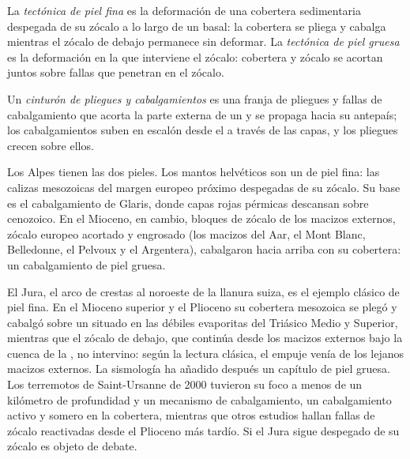 \begin{definition}\label{def:b2:alpine-orogen:skin}
La \emph{tectónica de piel fina} es la deformación de una
cobertera sedimentaria despegada de su zócalo a lo largo de un  basal: la cobertera se pliega y
cabalga mientras el zócalo de debajo permanece sin deformar. La \emph{tectónica de piel
gruesa} es la deformación en la que interviene el zócalo:
cobertera y zócalo se acortan juntos sobre fallas que penetran en el zócalo.
\end{definition}

\begin{definition}\label{def:b2:alpine-orogen:ftb}
Un \emph{cinturón de pliegues y cabalgamientos} es una franja de pliegues y fallas de cabalgamiento
que acorta la parte externa de un  y se propaga hacia su antepaís; los cabalgamientos
suben en escalón desde el  a través de las capas, y los pliegues crecen sobre ellos.
\end{definition}

Los Alpes tienen las dos pieles. Los mantos helvéticos son un  de piel fina: las
calizas mesozoicas del margen europeo próximo despegadas de su zócalo. Su base es
el cabalgamiento de Glaris, donde capas rojas pérmicas descansan sobre  cenozoico. En el Mioceno, en
cambio, bloques de zócalo de los macizos externos, zócalo europeo acortado y engrosado (los macizos del
Aar, el Mont Blanc, Belledonne, el Pelvoux y el Argentera), cabalgaron hacia arriba con su
cobertera: un cabalgamiento de piel gruesa.

El Jura, el arco de crestas al noroeste de la llanura suiza, es el ejemplo clásico de piel
fina. En el Mioceno superior y el Plioceno su cobertera mesozoica se plegó y cabalgó sobre un
 situado en las débiles evaporitas del Triásico Medio y Superior, mientras que el zócalo de
debajo, que continúa desde los macizos externos bajo la cuenca de la , no intervino: según
la lectura clásica, el empuje venía de los lejanos macizos externos. La sismología ha añadido después
un capítulo de piel gruesa. Los terremotos de Saint-Ursanne de 2000 tuvieron su foco a
menos de un kilómetro de profundidad y un mecanismo de cabalgamiento, un cabalgamiento activo y somero en la cobertera,
mientras que otros estudios hallan fallas de zócalo reactivadas desde el Plioceno más tardío. Si
el Jura sigue despegado de su zócalo es objeto de debate.

